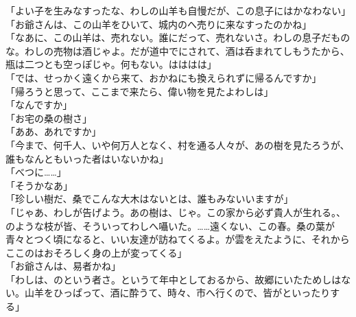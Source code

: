 \documentclass[
  paper=a5,
  fontsize=10pt,
  jafontsize=9.5pt,
  tate,                  %
  open_bracket_pos=nibu, %
]{jlreq}
\begin{document}
「よい子を生みなすったな、わしの山羊も自慢だが、この息子にはかなわない」\\


「お爺さんは、この山羊をひいて、城内のへ売りに来なすったのかね」\\


「なあに、この山羊は、売れない。誰にだって、売れないさ。わしの息子だものな。わしの売物は酒じゃよ。だが道中でにされて、酒は呑まれてしもうたから、瓶は二つとも空っぽじゃ。何もない。はははは」\\


「では、せっかく遠くから来て、おかねにも換えられずに帰るんですか」\\


「帰ろうと思って、ここまで来たら、偉い物を見たよわしは」\\


「なんですか」\\


「お宅の桑の樹さ」\\


「ああ、あれですか」\\


「今まで、何千人、いや何万人となく、村を通る人々が、あの樹を見たろうが、誰もなんともいった者はいないかね」\\


「べつに……」\\


「そうかなあ」\\


「珍しい樹だ、桑でこんな大木はないとは、誰もみないいますが」\\


「じゃあ、わしが告げよう。あの樹は、じゃ。この家から必ず貴人が生れる。、のような枝が皆、そういってわしへ囁いた。……遠くない、この春。桑の葉が青々とつく頃になると、いい友達が訪ねてくるよ。が雲をえたように、それからここのはおそろしく身の上が変ってくる」\\


「お爺さんは、易者かね」\\


「わしは、のという者さ。というて年中としておるから、故郷にいたためしはない。山羊をひっぱって、酒に酔うて、時々、市へ行くので、皆がといったりする」\\
\end{document}
